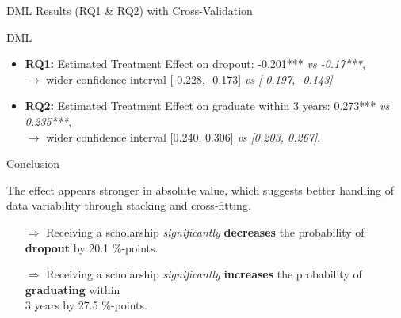 \documentclass[aspectratio=169]{beamer}
\begin{document}
\begin{frame}{DML Results (RQ1 \& RQ2) with Cross-Validation}

\vspace{10pt}
\begin{alertblock}{DML}
	\begin{itemize}[label=--,itemsep=1pt,topsep=2pt]
	\item \textbf{RQ1:} Estimated Treatment Effect on dropout: -0.201*** \textit{vs -0.17***},\\ $\rightarrow$ wider confidence interval [-0.228, -0.173] \textit{vs [-0.197, -0.143]}
	\item \textbf{RQ2:} Estimated Treatment Effect on graduate within 3 years:  0.273*** \textit{vs 0.235***},\\ 
    $\rightarrow$ wider confidence interval [0.240, 0.306] \textit{vs [0.203, 0.267]}.
	
\end{itemize}
\end{alertblock}
\vspace{3pt}

\begin{exampleblock}{Conclusion}

The effect appears stronger in absolute value, which suggests better handling of data variability through stacking and cross-fitting. \\
\vspace{-4pt}
\begin{itemize}
    \item [$\Rightarrow$]Receiving a scholarship \textit{significantly} \textbf{decreases} the probability of \textbf{dropout} by 20.1 \%-points.
    \item [$\Rightarrow$]Receiving a scholarship \textit{significantly} \textbf{increases} the probability of \textbf{graduating} within \\ 3 years by 27.5 \%-points.
\end{itemize}
\vspace{-3pt}
	
\end{exampleblock}

    
\end{frame}
\end{document}
